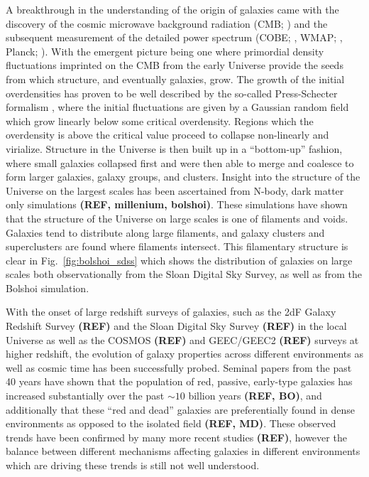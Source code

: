 A breakthrough in the understanding of the origin of galaxies came
with the discovery of the cosmic microwave background radiation (CMB;
\citealt{penzias1965}) and the subsequent measurement of the detailed
power spectrum (COBE; \citealt{mather1990}, WMAP;
\citealt{hinshaw2003}, Planck; \citealt{planck2014}).  With the
emergent picture being one where primordial density fluctuations
imprinted on the CMB from the early Universe provide the seeds from
which structure, and eventually galaxies, grow.  The growth of the
initial overdensities has proven to be well described by the so-called
Press-Schecter formalism \citep{press1974}, where the initial
fluctuations are given by a Gaussian random field which grow linearly
below some critical overdensity.  Regions which the overdensity is
above the critical value proceed to collapse non-linearly and
virialize.  Structure in the Universe is then built up in a
``bottom-up'' fashion, where small galaxies collapsed first and were
then able to merge and coalesce to form larger galaxies, galaxy
groups, and clusters.  Insight into the structure of the Universe on
the largest scales has been ascertained from N-body, dark matter only
simulations \textbf{(REF, millenium, bolshoi)}.  These simulations
have shown that the structure of the Universe on large scales is one
of filaments and voids.  Galaxies tend to distribute along large
filaments, and galaxy clusters and superclusters are found where
filaments intersect.  This filamentary structure is clear in
Fig.~\ref{fig:bolshoi_sdss} which shows the distribution of galaxies
on large scales both observationally from the Sloan Digital Sky
Survey, as well as from the Bolshoi simulation.
\par
With the onset of large redshift surveys of galaxies, such as the 2dF
Galaxy Redshift Survey \textbf{(REF)} and the Sloan Digital Sky Survey
\textbf{(REF)} in the local Universe as well as the COSMOS
\textbf{(REF)} and GEEC/GEEC2 \textbf{(REF)} surveys at higher
redshift, the evolution of galaxy properties across different
environments as well as cosmic time has been successfully probed.
Seminal papers from the past 40 years have shown that the population
of red, passive, early-type galaxies has increased substantially over
the past $\sim\!10$ billion years \textbf{(REF, BO)}, and additionally
that these ``red and dead'' galaxies are preferentially found in dense
environments as opposed to the isolated field \textbf{(REF, MD)}.
These observed trends have been confirmed by many more recent studies \textbf{(REF)},
however the balance between different mechanisms affecting galaxies in
different environments which are driving these trends is still not well understood.

